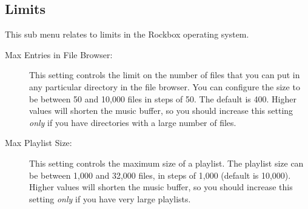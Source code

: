 
\subsection{Limits}
This sub menu relates to limits in the Rockbox operating system.
  \begin{description}
    \item [Max Entries in File Browser: ]This setting controls the limit on
    the number of files that you can put in any particular directory in the
    file browser. You can configure the size to be between 50 and
    10,000 files in steps of 50. The default is 400. Higher values will shorten
    the music buffer, so you should increase this setting \emph{only} if you have
    directories with a large number of files.

    \item [Max Playlist Size: ]This setting controls the maximum size of
    a playlist. The playlist size can be between 1,000 and 32,000 files,
    in steps of 1,000 (default is 10,000). Higher values will shorten the
    music buffer, so you should increase this setting \emph{only} if you
    have very large playlists.
  \end{description}


